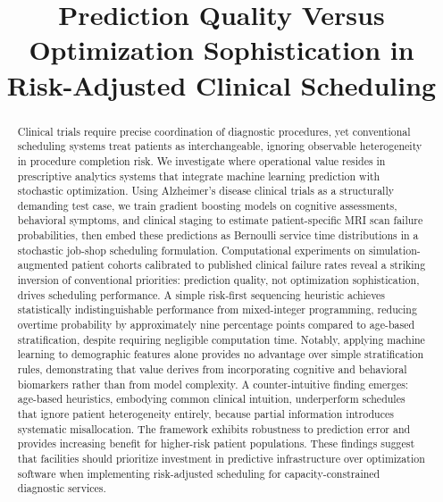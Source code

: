\documentclass[11pt,a4paper]{article}
\title{Prediction Quality Versus Optimization Sophistication in Risk-Adjusted Clinical Scheduling}
\date{}
\begin{document}
\maketitle

\renewcommand{\thefootnote}{*}
\renewcommand{\thefootnote}{\arabic{footnote}}

\begin{abstract}
Clinical trials require precise coordination of diagnostic procedures, yet conventional scheduling systems treat patients as interchangeable, ignoring observable heterogeneity in procedure completion risk. We investigate where operational value resides in prescriptive analytics systems that integrate machine learning prediction with stochastic optimization. Using Alzheimer's disease clinical trials as a structurally demanding test case, we train gradient boosting models on cognitive assessments, behavioral symptoms, and clinical staging to estimate patient-specific MRI scan failure probabilities, then embed these predictions as Bernoulli service time distributions in a stochastic job-shop scheduling formulation. Computational experiments on simulation-augmented patient cohorts calibrated to published clinical failure rates reveal a striking inversion of conventional priorities: prediction quality, not optimization sophistication, drives scheduling performance. A simple risk-first sequencing heuristic achieves statistically indistinguishable performance from mixed-integer programming, reducing overtime probability by approximately nine percentage points compared to age-based stratification, despite requiring negligible computation time. Notably, applying machine learning to demographic features alone provides no advantage over simple stratification rules, demonstrating that value derives from incorporating cognitive and behavioral biomarkers rather than from model complexity. A counter-intuitive finding emerges: age-based heuristics, embodying common clinical intuition, underperform schedules that ignore patient heterogeneity entirely, because partial information introduces systematic misallocation. The framework exhibits robustness to prediction error and provides increasing benefit for higher-risk patient populations. These findings suggest that facilities should prioritize investment in predictive infrastructure over optimization software when implementing risk-adjusted scheduling for capacity-constrained diagnostic services.
\end{abstract}
\end{document}
